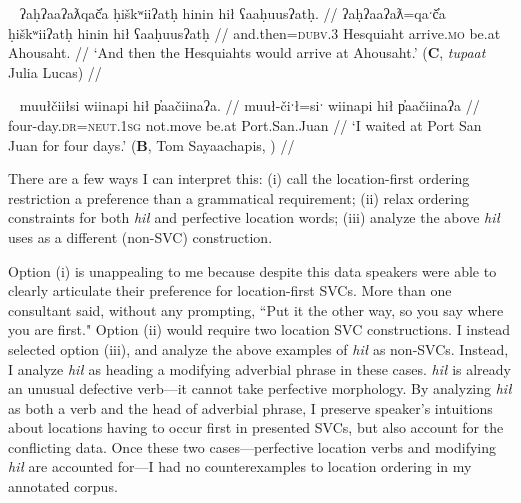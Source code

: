 \ex~ \label{ex:atahousaht2}
\begingl
\glpreamble ʔaḥʔaaʔaƛqač̓a ḥiškʷiiʔatḥ hinin hił ʕaaḥuusʔatḥ. //
\gla ʔaḥʔaaʔaƛ=qaˑč̓a ḥiškʷiiʔatḥ hinin hił ʕaaḥuusʔatḥ  //
\glb and.then=\textsc{dubv.3} Hesquiaht arrive.\textsc{mo} be.at Ahousaht. //
\glft `And then the Hesquiahts would arrive at Ahousaht.' (\textbf{C}, \textit{tupaat} Julia Lucas) //
\endgl
\xe 

\begin{comment}
\ex \label{ex:sleepinacanoe}
\begingl
\glpreamble weʔič̓aḥsʔaƛ k̓ʷalsic hił ʔanaḥʔis č̓apac ʔatḥii. //
\gla weʔič-!aḥs=!aƛ k̓ʷalsic hił ʔanaḥ=ʔis č̓apac ʔatḥii  //
\glb sleep.\textsc{dr}-in.a.vessel=\textsc{now} Kwalisits be.at size=\textsc{dim} canoe night. //
\glft `Kwalisits was sleeping in his little canoe through the night.' (\textbf{B}, Tom Sayaachapis, \citet[p.~3]{sapir1924}) //
\endgl
\xe
\end{comment}

\ex~ \label{ex:waitatsanjuan}
\begingl
\glpreamble muułčiiłsi wiinapi hił p̓aačiinaʔa. //
\gla muuł-čiˑł=siˑ wiinapi hił p̓aačiinaʔa  //
\glb four-day.\textsc{dr}=\textsc{neut.1sg} not.move be.at Port.San.Juan //
\glft `I waited at Port San Juan for four days.' (\textbf{B}, Tom Sayaachapis, \citet[p.~148]{sapir1939}) //
\endgl
\xe

There are a few ways I can interpret this: (i) call the location-first ordering restriction a preference than a grammatical requirement; (ii) relax ordering constraints for both \textit{hił} and perfective location words; (iii) analyze the above \textit{hił} uses as a different (non-SVC) construction.

Option (i) is unappealing to me because despite this data speakers were able to clearly articulate their preference for location-first SVCs. More than one consultant said, without any prompting, ``Put it the other way, so you say where you are first." Option (ii) would require two location SVC constructions. I instead selected option (iii), and analyze the above examples of \textit{hił} as non-SVCs. Instead, I analyze \textit{hił} as heading a modifying adverbial phrase in these cases. \textit{hił} is already an unusual defective verb---it cannot take perfective morphology. By analyzing \textit{hił} as both a verb and the head of adverbial phrase, I preserve speaker's intuitions about locations having to occur first in presented SVCs, but also account for the conflicting data. Once these two cases---perfective location verbs and modifying \textit{hił} are accounted for---I had no counterexamples to location ordering in my annotated corpus.

